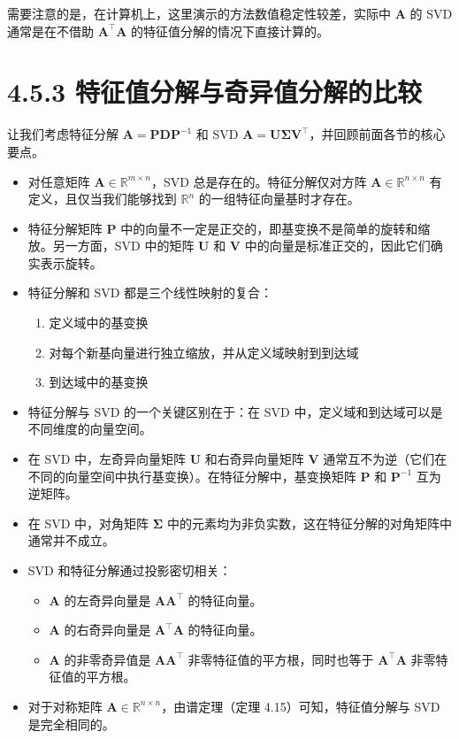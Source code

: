 \begin{notebox}
需要注意的是，在计算机上，这里演示的方法数值稳定性较差，实际中 $ \boldsymbol{A} $ 的 SVD 通常是在不借助 $ \boldsymbol{A}^\top \boldsymbol{A} $ 的特征值分解的情况下直接计算的。
\end{notebox}

\section*{4.5.3 特征值分解与奇异值分解的比较}

让我们考虑特征分解 $ \boldsymbol{A} = \boldsymbol{P} \boldsymbol{D} \boldsymbol{P}^{-1} $ 和 SVD $ \boldsymbol{A} = \boldsymbol{U} \boldsymbol{\Sigma} \boldsymbol{V}^\top $，并回顾前面各节的核心要点。

\begin{itemize}
\item 对任意矩阵 $ \boldsymbol{A} \in \mathbb{R}^{m \times n} $，SVD 总是存在的。特征分解仅对方阵 $ \boldsymbol{A} \in \mathbb{R}^{n \times n} $ 有定义，且仅当我们能够找到 $ \mathbb{R}^n $ 的一组特征向量基时才存在。
\item 特征分解矩阵 $ \boldsymbol{P} $ 中的向量不一定是正交的，即基变换不是简单的旋转和缩放。另一方面，SVD 中的矩阵 $ \boldsymbol{U} $ 和 $ \boldsymbol{V} $ 中的向量是标准正交的，因此它们确实表示旋转。
\item 特征分解和 SVD 都是三个线性映射的复合：
\begin{enumerate}
\item 定义域中的基变换
\item 对每个新基向量进行独立缩放，并从定义域映射到到达域
\item 到达域中的基变换
\end{enumerate}
\item 特征分解与 SVD 的一个关键区别在于：在 SVD 中，定义域和到达域可以是不同维度的向量空间。
\item 在 SVD 中，左奇异向量矩阵 $ \boldsymbol{U} $ 和右奇异向量矩阵 $ \boldsymbol{V} $ 通常互不为逆（它们在不同的向量空间中执行基变换）。在特征分解中，基变换矩阵 $ \boldsymbol{P} $ 和 $ \boldsymbol{P}^{-1} $ 互为逆矩阵。
\item 在 SVD 中，对角矩阵 $ \boldsymbol{\Sigma} $ 中的元素均为非负实数，这在特征分解的对角矩阵中通常并不成立。
\item SVD 和特征分解通过投影密切相关：
\begin{itemize}
\item $ \boldsymbol{A} $ 的左奇异向量是 $ \boldsymbol{A} \boldsymbol{A}^\top $ 的特征向量。
\item $ \boldsymbol{A} $ 的右奇异向量是 $ \boldsymbol{A}^\top \boldsymbol{A} $ 的特征向量。
\item $ \boldsymbol{A} $ 的非零奇异值是 $ \boldsymbol{A} \boldsymbol{A}^\top $ 非零特征值的平方根，同时也等于 $ \boldsymbol{A}^\top \boldsymbol{A} $ 非零特征值的平方根。
\end{itemize}
\item 对于对称矩阵 $ \boldsymbol{A} \in \mathbb{R}^{n \times n} $，由谱定理（定理 4.15）可知，特征值分解与 SVD 是完全相同的。
\end{itemize}


